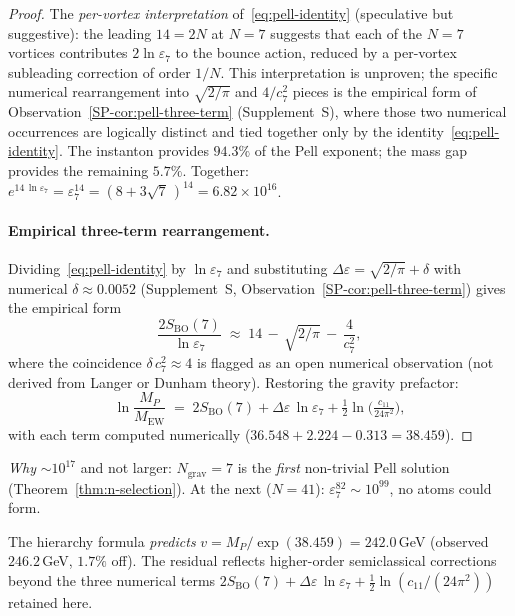 \begin{proof}
The \emph{per-vortex interpretation} of~\eqref{eq:pell-identity}
(speculative but suggestive): the leading $14 = 2N$ at $N = 7$
suggests that each of the $N = 7$ vortices contributes
$2\ln\varepsilon_7$ to the bounce action, reduced by a
per-vortex subleading correction of order $1/N$.
This interpretation is unproven; the specific numerical
rearrangement into $\sqrt{2/\pi}$ and $4/c_7^2$ pieces is the
empirical form of Observation~\ref*{SP-cor:pell-three-term}
(Supplement~S), where those two numerical occurrences are
logically distinct and tied together only by the
identity~\eqref{eq:pell-identity}.
The instanton provides $94.3\%$ of the Pell exponent;
the mass gap provides the remaining $5.7\%$.
Together: $e^{14\,\ln\varepsilon_7} = \varepsilon_7^{14}
= (8{+}3\sqrt{7}\,)^{14} = 6.82 \times 10^{16}$.

\paragraph{Empirical three-term rearrangement.}
Dividing~\eqref{eq:pell-identity} by $\ln\varepsilon_7$
and substituting $\Delta\varepsilon = \sqrt{2/\pi} + \delta$
with numerical $\delta \approx 0.0052$
(Supplement~S, Observation~\ref*{SP-cor:pell-three-term})
gives the empirical form
\[
  \frac{2S_{\mathrm{BO}}(7)}{\ln\varepsilon_7}
  \;\approx\; 14 \,-\, \sqrt{2/\pi} \,-\, \frac{4}{c_7^2},
\]
where the coincidence $\delta\,c_7^2 \approx 4$ is flagged
as an open numerical observation (not derived from Langer or
Dunham theory).  Restoring the gravity prefactor:
\[
  \ln\frac{M_P}{M_{\mathrm{EW}}}
  \;=\; 2S_{\mathrm{BO}}(7) + \Delta\varepsilon\,\ln\varepsilon_7
  + \tfrac{1}{2}\ln\!\bigl(\tfrac{c_{11}}{24\pi^2}\bigr),
\]
with each term computed numerically
($36.548 + 2.224 - 0.313 = 38.459$).
\end{proof}

\noindent
\emph{Why} $\sim\!10^{17}$ and not larger:
$N_{\mathrm{grav}} = 7$ is the \emph{first} non-trivial Pell solution
(Theorem~\ref{thm:n-selection}).
At the next ($N = 41$):
$\varepsilon_7^{82} \sim 10^{99}$, no atoms could form.

\begin{remark}
The hierarchy formula \emph{predicts}
$v = M_P / \exp(38.459) = 242.0$\,GeV
(observed $246.2$\,GeV, $1.7\%$ off).
The residual reflects higher-order semiclassical corrections
beyond the three numerical terms
$2S_{\mathrm{BO}}(7) + \Delta\varepsilon\,\ln\varepsilon_7
+ \tfrac12\ln(c_{11}/(24\pi^2))$ retained here.
\end{remark}

